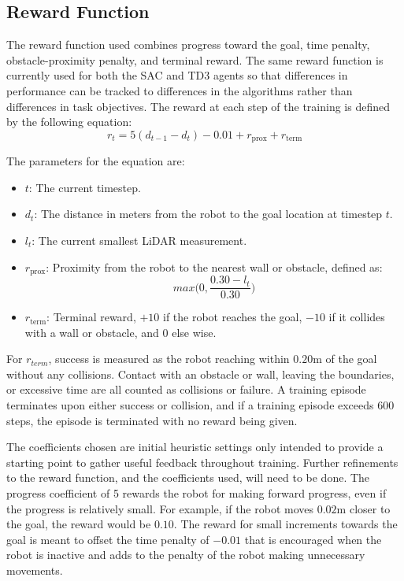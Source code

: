 \documentclass[conference, 11pt]{IEEEtran}
\begin{document}
\subsection{Reward Function}
The reward function used combines progress toward the goal, time penalty, obstacle-proximity penalty, and terminal reward.
The same reward function is currently used for both the SAC and TD3 agents so that differences in performance can be tracked to differences in the algorithms rather than differences in task objectives. 
The reward at each step of the training is defined by the following equation:
    \begin{equation}
        r_t = 5(d_{t-1} - d_t) - 0.01 + r_{\mathrm{prox}} + r_{\mathrm{term}}
    \end{equation}

The parameters for the equation are:
    \begin{itemize}
        \item $t$: The current timestep.

        \item $d_t$: The distance in meters from the robot to the goal location at timestep $t$.

        \item $l_t$: The current smallest LiDAR measurement.

        \item $r_{\mathrm{prox}}$: Proximity from the robot to the nearest wall or obstacle, defined as:
            \begin{equation}
                max\Big(0, \frac{0.30-l_t}{0.30}\Big)
            \end{equation}

        \item $r_{\mathrm{term}}$: Terminal reward, $+10$ if the robot reaches the goal, $-10$ if it collides with a wall or obstacle, and $0$ else wise.
    \end{itemize}

For $r_{term}$, success is measured as the robot reaching within $0.20 \mathrm{m}$ of the goal without any collisions.
Contact with an obstacle or wall, leaving the boundaries, or excessive time are all counted as collisions or failure. 
A training episode terminates upon either success or collision, and if a training episode exceeds 600 steps, the episode is terminated with no reward being given. 

The coefficients chosen are initial heuristic settings only intended to provide a starting point to gather useful feedback throughout training.
Further refinements to the reward function, and the coefficients used, will need to be done. 
The progress coefficient of 5 rewards the robot for making forward progress, even if the progress is relatively small. For example, if the robot moves $0.02 \mathrm{m}$ closer to the goal, the reward would be $0.10$. 
The reward for small increments towards the goal is meant to offset the time penalty of $-0.01$ that is encouraged when the robot is inactive and adds to the penalty of the robot making unnecessary movements. 
\end{document}
